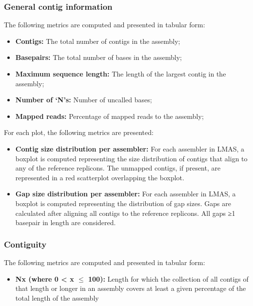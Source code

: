 \subsubsection{General contig information}

The following metrics are computed and presented in tabular form: 

\begin{itemize}
    \item \textbf{Contigs:} The total number of contigs in the assembly;
    \item \textbf{Basepairs:} The total number of bases in the assembly;
    \item \textbf{Maximum sequence length:} The length of the largest contig in the assembly;
    \item \textbf{Number of ‘N’s:} Number of uncalled bases;
    \item \textbf{Mapped reads:} Percentage of mapped reads to the assembly;
\end{itemize}

For each plot, the following metrics are presented:

\begin{itemize}
    \item \textbf{Contig size distribution per assembler:} For each assembler in LMAS, a boxplot is computed representing the size distribution of contigs that align to any of the reference replicons. The unmapped contigs, if present, are represented in a red scatterplot overlapping the boxplot. 
    \item \textbf{Gap size distribution per assembler:} For each assembler in LMAS, a boxplot is computed representing the distribution of gap sizes. Gaps are calculated after aligning all contigs to the reference replicons. All gaps ≥1 basepair in length are considered. 
\end{itemize}

\subsubsection{Contiguity}

The following metrics are computed and presented in tabular form:

\begin{itemize}
    \item \textbf{Nx (where 0  < x  $\leq$ 100):} Length for which the collection of all contigs of that length or longer in an assembly covers at least a given percentage of the total length of the assembly
\end{itemize}

